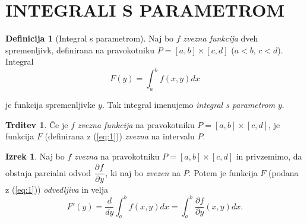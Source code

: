 \documentclass[11pt]{article}
\theoremstyle{definition}
\newtheorem{definicija}{Definicija}[section]
\theoremstyle{definition}
\newtheorem{trditev}{Trditev}[section]
\theoremstyle{definition}
\newtheorem{izrek}{Izrek}[section]
\begin{document}

\pagebreak


\section{INTEGRALI S PARAMETROM}
\vspace{0.5cm}


\begin{definicija}[Integral s parametrom]

Naj bo $f$ \textit{zvezna funkcija} dveh spremenljivk, definirana na pravokotniku $P = [a, b] \times [c, d]$ ($a < b$, $c < d$). Integral
\begin{equation}
\label{eq:1}
	F(y) = \int_{a}^{b} f(x, y) dx
\end{equation}

je funkcija spremenljivke $y$. Tak integral imenujemo \textit{integral s parametrom} $y$.

\end{definicija}
\vspace{0.5cm}

\begin{trditev}

Če je $f$ \textit{zvezna funkcija} na pravokotniku $P = [a, b] \times [c, d]$, je funkcija $F$ (definirana z (\ref{eq:1})) \textit{zvezna} na intervalu $P$.

\end{trditev}
\vspace{0.5cm}

\begin{izrek}

Naj bo $f$ \textit{zvezna} na pravokotniku $P = [a, b] \times [c, d]$ in privzemimo, da obstaja parcialni odvod $\cfrac{\partial f}{\partial y}$, ki naj bo \textit{zvezen} na $P$. Potem je funkcija $F$ (podana z (\ref{eq:1})) \textit{odvedljiva} in velja 
\begin{equation}
	F'(y) = \frac{d}{dy} \int_{a}^{b} f(x, y) dx = \int_{a}^{b} \frac{\partial f}{\partial y} (x, y) dx.
\end{equation}

\end{izrek}
\vspace{0.5cm}
\end{document}
